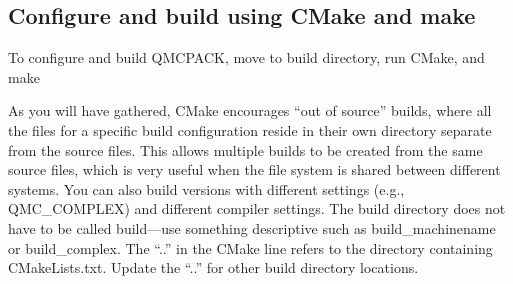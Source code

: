 \documentclass[letterpaper,10pt,english]{sphinxmanual}
\begin{document}
\begin{sphinxVerbatim}[commandchars=\\\{\}]
\end{sphinxVerbatim}


\subsection{Configure and build using CMake and make}
\label{\detokenize{installation:configure-and-build-using-cmake-and-make}}
To configure and build QMCPACK, move to build directory, run CMake, and make

\begin{sphinxVerbatim}[commandchars=\\\{\}]
 
 
  
\end{sphinxVerbatim}

As you will have gathered, CMake encourages “out of source” builds,
where all the files for a specific build configuration reside in their
own directory separate from the source files. This allows multiple
builds to be created from the same source files, which is very useful
when the file system is shared between different systems. You can also
build versions with different settings (e.g., QMC\_COMPLEX) and
different compiler settings. The build directory does not have to be
called build—use something descriptive such as build\_machinename or
build\_complex. The “..” in the CMake line refers to the directory
containing CMakeLists.txt. Update the “..” for other build
directory locations.
\end{document}
